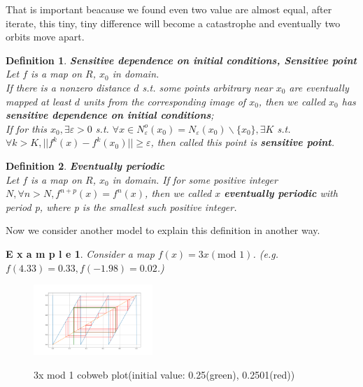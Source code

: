 \documentclass[12pt]{article}
\theoremstyle{plain}
\newtheorem{definition}{{\color{red}\textbf{Definition}}}[section]
\newtheorem{example}{\textbf{E x a m p l e}}[section]
\begin{document}
That is important beacause we found even two value are almost equal, after iterate, this tiny, tiny difference will become a catastrophe and eventually two orbits move apart.

\begin{definition}\textbf{Sensitive dependence on initial conditions, Sensitive point}
\\\noindent Let $f$ is a map on $R$, $x_0$ in domain.
\\\noindent If there is a nonzero distance $d$ s.t. some points arbitrary near $x_0$ are eventually mapped at least $d$ units from the corresponding image of $x_0$, then we called $x_0$ has \textbf{sensitive dependence on initial conditions};
\\\noindent If for this $x_0, \exists \varepsilon > 0$ s.t. $\forall x \in N_\varepsilon^o(x_0) = N_\varepsilon(x_0) \backslash \{x_0\}, \exists K$ s.t. $\forall k > K, ||f^k(x) - f^k(x_0)|| \geq \varepsilon$, then called this point is \textbf{sensitive point}.
\end{definition}
\begin{definition}\textbf{Eventually periodic}
\\\noindent Let $f$ is a map on $R$, $x_0$ in domain. If for some positive integer $N, \forall n > N, f^{n+p}(x) = f^n(x)$, then we called $x$ \textbf{eventually periodic} with period p, where p is the smallest such positive integer.
\end{definition}

Now we consider another model to explain this definition in another way.

\begin{example}Consider a map $f(x) = 3x (\text{mod } 1)$. (e.g. $f(4.33) = 0.33, f(-1.98) = 0.02$.)
\end{example}

\begin{figure}[H]
\begin{center}
\includegraphics[width=0.4\textwidth]{figure/section1/3xmod1.png} \\
\caption{3x mod 1 cobweb plot(initial value: {\color{green}0.25(green)}, {\color{red}0.2501(red)})}\label{3xmod1}
\end{center}
\end{figure}
\end{document}
